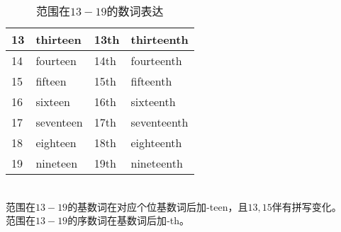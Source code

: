 \documentclass[UTF8]{ctexart}
\newcommand{\littf}[1]{{\hspace{3pt}\ttfamily #1}}
\begin{document}
    \begin{table}[h!]
        \begin{center}
            \ttfamily
            \begin{tabular}{p{40pt}|p{100pt}|p{40pt}|p{100pt}}
                \hline
                13&thirteen&13th&thirteenth\\ \hline
                14&fourteen&14th&fourteenth\\ \hline
                15&fifteen&15th&fifteenth\\ \hline
                16&sixteen&16th&sixteenth\\ \hline
                17&seventeen&17th&seventeenth\\ \hline
                18&eighteen&18th&eighteenth\\ \hline
                19&nineteen&19th&nineteenth\\ \hline
            \end{tabular}
            \rmfamily
            \caption{范围在$13-19$的数词表达}
        \end{center}
    \end{table}\\
    范围在$13-19$的基数词在对应个位基数词后加\littf{-teen}，且$13,15$伴有拼写变化。\\[3mm]
    范围在$13-19$的序数词在基数词后加\littf{-th}。

\newpage
\end{document}
